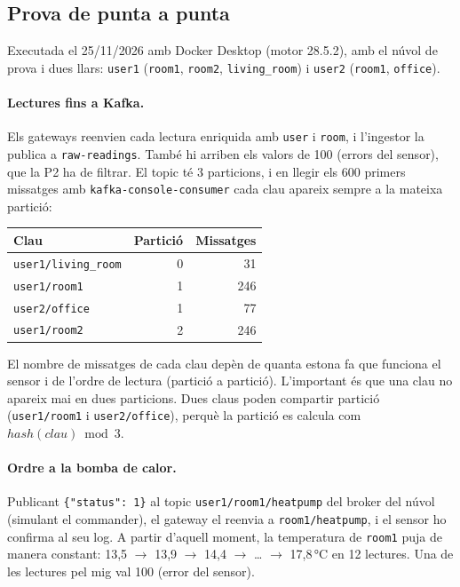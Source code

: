 \documentclass[11pt,a4paper]{article}
\begin{document}
\subsection{Prova de punta a punta}
Executada el 25/11/2026 amb Docker Desktop (motor 28.5.2), amb el núvol de
prova i dues llars: \texttt{user1} (\texttt{room1}, \texttt{room2},
\texttt{living\_room}) i \texttt{user2} (\texttt{room1}, \texttt{office}).

\paragraph{Lectures fins a Kafka.}
Els gateways reenvien cada lectura enriquida amb \texttt{user} i
\texttt{room}, i l'ingestor la publica a \texttt{raw-readings}. També hi
arriben els valors de 100 (errors del sensor), que la P2 ha de filtrar. El
topic té 3 particions, i en llegir els 600 primers missatges amb
\texttt{kafka-console-consumer} cada clau apareix sempre a la mateixa
partició:
\begin{center}
\begin{tabular}{@{}lrr@{}}
\toprule
Clau & Partició & Missatges \\
\midrule
\texttt{user1/living\_room} & 0 & 31 \\
\texttt{user1/room1} & 1 & 246 \\
\texttt{user2/office} & 1 & 77 \\
\texttt{user1/room2} & 2 & 246 \\
\bottomrule
\end{tabular}
\end{center}
El nombre de missatges de cada clau depèn de quanta estona fa que funciona el
sensor i de l'ordre de lectura (partició a partició). L'important és que una
clau no apareix mai en dues particions. Dues claus poden compartir partició
(\texttt{user1/room1} i \texttt{user2/office}), perquè la partició es calcula
com $\mathit{hash}(\mathit{clau}) \bmod 3$.

\paragraph{Ordre a la bomba de calor.}
Publicant \texttt{\{"status": 1\}} al topic \texttt{user1/room1/heatpump}
del broker del núvol (simulant el commander), el gateway el reenvia a
\texttt{room1/heatpump}, i el sensor ho confirma al seu log. A partir
d'aquell moment, la temperatura de \texttt{room1} puja de manera constant:
13,5 $\rightarrow$ 13,9 $\rightarrow$ 14,4 $\rightarrow$ \ldots
$\rightarrow$ 17,8\,°C en 12 lectures. Una de les lectures pel mig val 100
(error del sensor).
\end{document}
